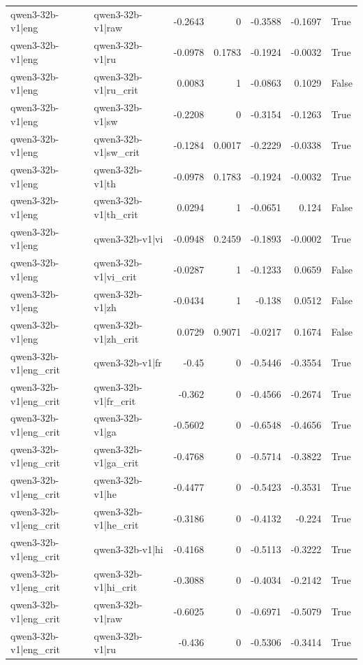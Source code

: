 \begin{table}
\begin{tabular}{l l r r r r l}
qwen3-32b-v1|eng & qwen3-32b-v1|raw & -0.2643 & 0 & -0.3588 & -0.1697 & True \\
qwen3-32b-v1|eng & qwen3-32b-v1|ru & -0.0978 & 0.1783 & -0.1924 & -0.0032 & True \\
qwen3-32b-v1|eng & qwen3-32b-v1|ru_crit & 0.0083 & 1 & -0.0863 & 0.1029 & False \\
qwen3-32b-v1|eng & qwen3-32b-v1|sw & -0.2208 & 0 & -0.3154 & -0.1263 & True \\
qwen3-32b-v1|eng & qwen3-32b-v1|sw_crit & -0.1284 & 0.0017 & -0.2229 & -0.0338 & True \\
qwen3-32b-v1|eng & qwen3-32b-v1|th & -0.0978 & 0.1783 & -0.1924 & -0.0032 & True \\
qwen3-32b-v1|eng & qwen3-32b-v1|th_crit & 0.0294 & 1 & -0.0651 & 0.124 & False \\
qwen3-32b-v1|eng & qwen3-32b-v1|vi & -0.0948 & 0.2459 & -0.1893 & -0.0002 & True \\
qwen3-32b-v1|eng & qwen3-32b-v1|vi_crit & -0.0287 & 1 & -0.1233 & 0.0659 & False \\
qwen3-32b-v1|eng & qwen3-32b-v1|zh & -0.0434 & 1 & -0.138 & 0.0512 & False \\
qwen3-32b-v1|eng & qwen3-32b-v1|zh_crit & 0.0729 & 0.9071 & -0.0217 & 0.1674 & False \\
qwen3-32b-v1|eng_crit & qwen3-32b-v1|fr & -0.45 & 0 & -0.5446 & -0.3554 & True \\
qwen3-32b-v1|eng_crit & qwen3-32b-v1|fr_crit & -0.362 & 0 & -0.4566 & -0.2674 & True \\
qwen3-32b-v1|eng_crit & qwen3-32b-v1|ga & -0.5602 & 0 & -0.6548 & -0.4656 & True \\
qwen3-32b-v1|eng_crit & qwen3-32b-v1|ga_crit & -0.4768 & 0 & -0.5714 & -0.3822 & True \\
qwen3-32b-v1|eng_crit & qwen3-32b-v1|he & -0.4477 & 0 & -0.5423 & -0.3531 & True \\
qwen3-32b-v1|eng_crit & qwen3-32b-v1|he_crit & -0.3186 & 0 & -0.4132 & -0.224 & True \\
qwen3-32b-v1|eng_crit & qwen3-32b-v1|hi & -0.4168 & 0 & -0.5113 & -0.3222 & True \\
qwen3-32b-v1|eng_crit & qwen3-32b-v1|hi_crit & -0.3088 & 0 & -0.4034 & -0.2142 & True \\
qwen3-32b-v1|eng_crit & qwen3-32b-v1|raw & -0.6025 & 0 & -0.6971 & -0.5079 & True \\
qwen3-32b-v1|eng_crit & qwen3-32b-v1|ru & -0.436 & 0 & -0.5306 & -0.3414 & True \\

\end{tabular}
\end{table}
